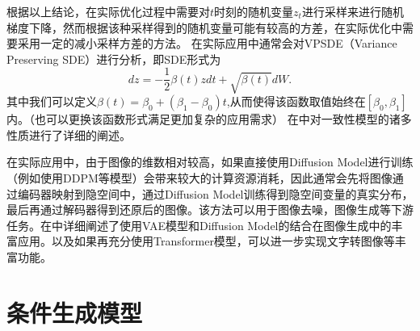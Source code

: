 根据以上结论，在实际优化过程中需要对$t$时刻的随机变量$z_t$进行采样来进行随机梯度下降，然而根据该种采样得到的随机变量可能有较高的方差，在实际优化中需要采用一定的减小采样方差的方法。 在实际应用中通常会对VPSDE（Variance Preserving SDE）进行分析，即SDE形式为
\begin{equation}
    dz = -\frac{1}{2}\beta(t)zdt + \sqrt{\beta(t)}dW.
    \label{VPSDE}
\end{equation}
其中我们可以定义$\beta(t) = \beta_0+(\beta_1-\beta_0)t$,从而使得该函数取值始终在$[\beta_0,\beta_1]$内。（也可以更换该函数形式满足更加复杂的应用需求）
在\cite{Consistency}中对一致性模型的诸多性质进行了详细的阐述。\par 
在实际应用中，由于图像的维数相对较高，如果直接使用Diffusion Model进行训练（例如使用DDPM等模型）会带来较大的计算资源消耗，因此通常会先将图像通过编码器映射到隐空间中，通过Diffusion Model训练得到隐空间变量的真实分布，最后再通过解码器得到还原后的图像。该方法可以用于图像去噪，图像生成等下游任务。在\cite{High_synthesis}中详细阐述了使用VAE模型和Diffusion Model的结合在图像生成中的丰富应用。以及如果再充分使用Transformer模型，可以进一步实现文字转图像等丰富功能。
\section{条件生成模型}
